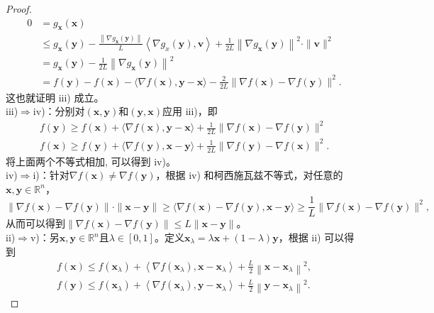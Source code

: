 \begin{proof}
\begin{equation}
\begin{aligned}
0 &=g_{\bm{x}}(\bm{x}) \\
& \leq g_{\bm{x}}(\bm{y})-\frac{\left\|\nabla g_{\bm{x}}(\bm{y})\right\|}{L}\left\langle\nabla g_{x}(\bm{y}), \bm{v}\right\rangle+\frac{1}{2 L}\left\|\nabla g_{\bm{x}}(\bm{y})\right\|^{2} \cdot\|\bm{v}\|^{2} \\
&=g_{\bm{x}}(\bm{y})-\frac{1}{2 L}\left\|\nabla g_{\bm{x}}(\bm{y})\right\|^{2} \\
&=f(\bm{y})-f(\bm{x})-\langle\nabla f(\bm{x}), \bm{y}-\bm{x}\rangle-\frac{2}{2 L}\|\nabla f(\bm{x})-\nabla f(\bm{y})\|^{2} .
    \end{aligned}
    \nonumber
\end{equation}
这也就证明 iii) 成立。\\
iii)$ \Rightarrow  $iv)：分别对$  (\bm{x}, \bm{y})  $和$  (\bm{y}, \bm{x})  $应用 iii)，即
\begin{equation}
\begin{array}{l}
f(\bm{y}) \geq f(\bm{x})+\langle\nabla f(\bm{x}), \bm{y}-\bm{x}\rangle+\frac{1}{2 L}\|\nabla f(\bm{x})-\nabla f(\bm{y})\|^{2} \\
f(\bm{x}) \geq f(\bm{y})+\langle\nabla f(\bm{y}), \bm{x}-\bm{y}\rangle+\frac{1}{2 L}\|\nabla f(\bm{y})-\nabla f(\bm{x})\|^{2} .
\end{array}
    \nonumber
\end{equation}
将上面两个不等式相加, 可以得到 iv)。 \\
iv)$  \Rightarrow  $i)：针对$  \nabla f(\bm{x}) \neq \nabla f(\bm{y}) $，根据 iv) 和柯西施瓦兹不等式，对任意的$\bm{x}, \bm{y} \in \mathbb{R}^{n}$，
\begin{equation}
\|\nabla f(\bm{x})-\nabla f(\bm{y})\| \cdot\|\bm{x}-\bm{y}\| \geq\langle\nabla f(\bm{x})-\nabla f(\bm{y}), \bm{x}-\bm{y}\rangle \geq \frac{1}{L}\|\nabla f(\bm{x})-\nabla f(\bm{y})\|^{2} ,
    \nonumber
\end{equation}
从而可以得到$  \|\nabla f(\bm{x})-\nabla f(\bm{y})\| \leq L\|\bm{x}-\bm{y}\|  $。 \\
ii)$  \Rightarrow $v)：另$  \bm{x}, \bm{y} \in \mathbb{R}^{n}  $且$  \lambda \in[0,1]  $。定义$  \bm{x}_{\lambda}=\lambda \bm{x}+(1-\lambda) \bm{y} $，根据 ii) 可以得到
\begin{equation}
\begin{array}{l}
f(\bm{x}) \leq f\left(\bm{x}_{\lambda}\right)+\left\langle\nabla f\left(\bm{x}_{\lambda}\right), \bm{x}-\bm{x}_{\lambda}\right\rangle+\frac{L}{2}\left\|\bm{x}-\bm{x}_{\lambda}\right\|^{2}, \\
f(\bm{y}) \leq f\left(\bm{x}_{\lambda}\right)+\left\langle\nabla f\left(\bm{x}_{\lambda}\right), \bm{y}-\bm{x}_{\lambda}\right\rangle+\frac{L}{2}\left\|\bm{y}-\bm{x}_{\lambda}\right\|^{2} .

\end{array}
\end{equation}
\end{proof}
